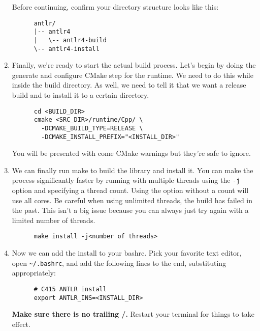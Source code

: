 \documentclass[../setup.tex]{subfiles}
\begin{document}
\begin{enumerate}
    Before continuing, confirm your directory structure looks like this:
    \begin{lstlisting}
      antlr/
      |-- antlr4
      |   \-- antlr4-build
      \-- antlr4-install
    \end{lstlisting}
  \item
    Finally, we're ready to start the actual build process. Let's begin by doing the generate and
    configure CMake step for the runtime. We need to do this while inside the build directory. As
    well, we need to tell it that we want a release build and to install it to a certain directory.
    \begin{lstlisting}
      cd <BUILD_DIR>
      cmake <SRC_DIR>/runtime/Cpp/ \
        -DCMAKE_BUILD_TYPE=RELEASE \
        -DCMAKE_INSTALL_PREFIX="<INSTALL_DIR>"
    \end{lstlisting}
    You will be presented with come CMake warnings but they're safe to ignore.
  \item
    We can finally run make to build the library and install it. You can make the process
    significantly faster by running with multiple threads using the \lstinline{-j} option and
    specifying a thread count. Using the option without a count will use all cores. Be careful when
    using unlimited threads, the build has failed in the past. This isn't a big issue because you
    can always just try again with a limited number of threads.
    \begin{lstlisting}
      make install -j<number of threads>
    \end{lstlisting}
  \item
    Now we can add the install to your bashrc. Pick your favorite text editor, open
    \lstinline{~/.bashrc}, and add the following lines to the end, substituting
    appropriately:
    \begin{lstlisting}
      # C415 ANTLR install
      export ANTLR_INS=<INSTALL_DIR>
    \end{lstlisting}
    \textbf{Make sure there is no trailing /.} Restart your terminal for things to take effect.
\end{enumerate}
\end{document}

